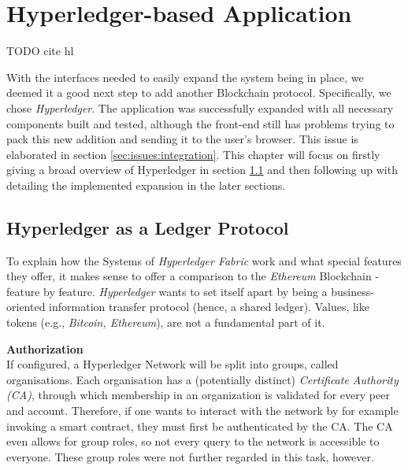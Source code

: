 %
\section{Hyperledger-based Application}
\label{sec:impr:hl}

TODO cite hl

With the interfaces needed to easily expand the system being in place, we deemed it a good next step to add another Blockchain protocol. Specifically, we chose \emph{Hyperledger}. The application was successfully expanded with all necessary components built and tested, although the front-end still has problems trying to pack this new addition and sending it to the user's browser. This issue is elaborated in section \ref{sec:issues:integration}. This chapter will focus on firstly giving a broad overview of Hyperledger in section \ref{sec:impr:hl:basics} and then following up with detailing the implemented expansion in the later sections.

\subsection{Hyperledger as a Ledger Protocol}
\label{sec:impr:hl:basics}

To explain how the Systems of \emph{Hyperledger Fabric} work and what special features they offer, it makes sense to offer a comparison to the \emph{Ethereum} Blockchain - feature by feature. \emph{Hyperledger} wants to set itself apart by being a business-oriented information transfer protocol (hence, a shared ledger). Values, like tokens (e.g., \emph{Bitcoin, Ethereum}), are not a fundamental part of it.

\textbf{Authorization} \\[0.2em]
If configured, a Hyperledger Network will be split into groups, called organisations. Each organisation has a (potentially distinct) \emph{Certificate Authority (CA)}, through which membership in an organization is validated for every peer and account. Therefore, if one wants to interact with the network by for example invoking a smart contract, they must first be authenticated  by the CA. The CA even allows for group roles, so not every query to the network is accessible to everyone. These group roles were not further regarded in this task, however.

